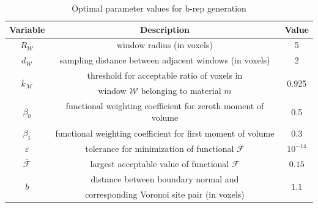 \begin{table}[ht!]
 \centering
   \begin{tabular}{|c||c|c|}
   \hline 
   \textbf{Variable} & \textbf{Description} & \textbf{Value} \\ \hline \hline
   $R_{\mathcal{W}}$ & window radius (in voxels) & 5 \\ \hline
   $d_{\mathcal{W}}$ & sampling distance between adjacent windows (in voxels) & 2 \\ \hline
   \multirow{2}{*}{$\overline{k}_{\mathcal{M}}$ \rule{0mm}{4mm}} & threshold for acceptable ratio of voxels in & \multirow{2}{*}{0.925} \\
   {} & window $\mathcal{W}$ belonging to material $m$ & {} \\ \hline
   $\beta_0$ & functional weighting coefficient for zeroth moment of volume & 0.5 \\ \hline
   $\beta_1$ & functional weighting coefficient for first moment of volume & 0.3 \\ \hline   
   $\varepsilon$ & tolerance for minimization of functional $\mathcal{F}$ & $10^{-14}$ \rule{0mm}{4mm} \\ \hline
   $\overline{\mathcal{F}}$ \rule{0mm}{4mm} & largest acceptable value of functional $\mathcal{F}$ & $0.15$ \\ \hline
   \multirow{2}{*}{$b$} & distance between boundary normal and & \multirow{2}{*}{$1.1$} \\
   {} & corresponding Voronoi site pair (in voxels) & {} \\ \hline
\end{tabular}
\caption{Optimal parameter values for b-rep generation}
\label{tab:Mod5}
\end{table}

